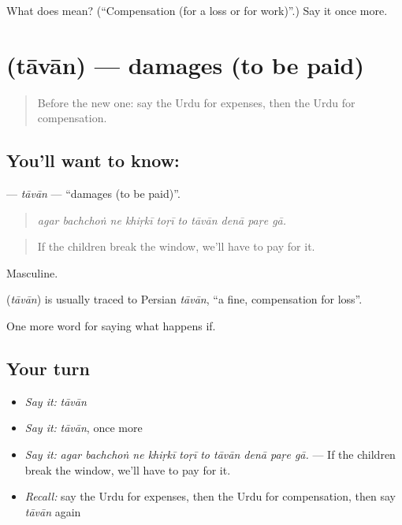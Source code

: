 \begin{tcolorbox}[breakable,colback=teal!4,colframe=teal!35!black,title={Before you move on}]
What does  mean? (\textquotedblleft{}Compensation (for a loss or for work)\textquotedblright{}.) Say it once more.
\end{tcolorbox}
\section[\texorpdfstring{\ur{تاوان} (tāvān)}{تاوان (tāvān)}]{ (tāvān) — damages (to be paid)}

\label{lesson:UR-C540-tavan}



\begin{quote}
Before the new one: say the Urdu for expenses, then the Urdu for compensation.
\end{quote}

\subsection*{You'll want to know: }
\textbf{} — \emph{tāvān} — \textquotedblleft{}damages (to be paid)\textquotedblright{}.

\begin{quote}
         
\end{quote}

\begin{quote}
\emph{agar bachchoṅ ne khiṛkī toṛī to tāvān denā paṛe gā.}
\end{quote}

\begin{quote}
If the children break the window, we'll have to pay for it.
\end{quote}

Masculine.

\begin{cousinweb}
\textbf{} (\emph{tāvān}) is usually traced to Persian \emph{tāvān}, \textquotedblleft{}a fine, compensation for loss\textquotedblright{}.
\end{cousinweb}

\begin{grammarlens}[title={What you've built}]
One more word for saying what happens if.
\end{grammarlens}

\subsection*{Your turn}
\begin{itemize}
\raggedright
  \item \emph{Say it:} \emph{tāvān}
  \item \emph{Say it:} \emph{tāvān}, once more
  \item \emph{Say it:} \emph{agar bachchoṅ ne khiṛkī toṛī to tāvān denā paṛe gā.} — If the children break the window, we'll have to pay for it.
  \item \emph{Recall:} say the Urdu for expenses, then the Urdu for compensation, then say \emph{tāvān} again
\end{itemize}

